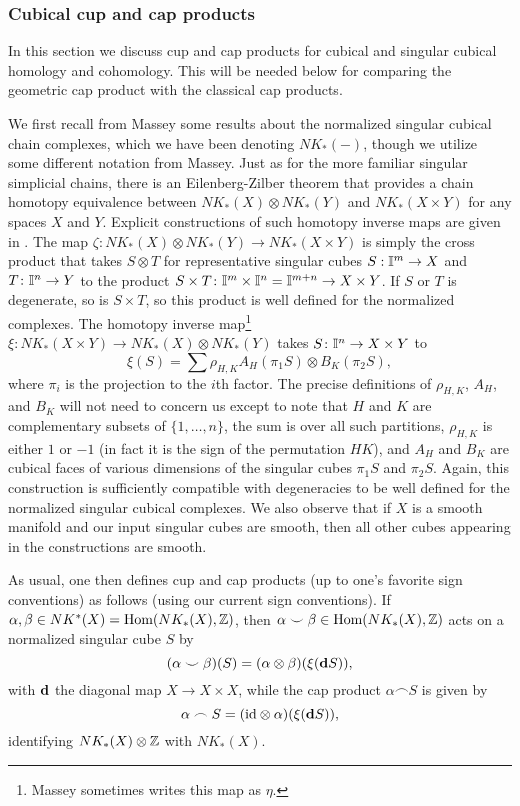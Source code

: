 \subsubsection{Cubical cup and cap products}\label{S: cubical products}

In this section we discuss cup and cap products for cubical and singular cubical homology and cohomology.
This will be needed below for comparing the geometric cap product with the classical cap products.

We first recall from Massey \cite[Chapter XI]{Mas91} some results about the normalized singular cubical chain complexes, which we have been denoting $NK_*(-)$, though we utilize some different notation from Massey.
Just as for the more familiar singular simplicial chains, there is an Eilenberg-Zilber theorem that provides a chain homotopy equivalence between $NK_*(X) \otimes NK_*(Y)$ and $NK_*(X \times Y)$ for any spaces $X$ and $Y$.
Explicit constructions of such homotopy inverse maps are given in \cite[Section XI.5]{Mas91}.
The map $\zeta: NK_*(X) \otimes NK_*(Y) \to NK_*(X \times Y)$ is simply the cross product that takes $S \otimes T$ for representative singular cubes $S: \mathbb{I}^m \to X$ and $T \colon \mathbb{I}^n \to Y$ to the product $S \times T \colon \mathbb{I}^m \times \mathbb{I}^n = \mathbb{I}^{m+n} \to X \times Y$.
If $S$ or $T$ is degenerate, so is $S \times T$, so this product is well defined for the normalized complexes.
The homotopy inverse map\footnote{Massey sometimes writes this map as $\eta$.} $\xi: NK_*(X \times Y) \to NK_*(X) \otimes NK_*(Y)$ takes $S \colon \mathbb{I}^n \to X \times Y$ to
$$\xi(S) = \sum \rho_{H,K}A_H(\pi_1S) \otimes B_K(\pi_2S),$$ where $\pi_i$ is the projection to the $i$th factor.
The precise definitions of $\rho_{H,K}$, $A_H$, and $B_K$ will not need to concern us except to note that $H$ and $K$ are complementary subsets of $\{1,\ldots, n\}$, the sum is over all such partitions, $\rho_{H,K}$ is either $1$ or $-1$ (in fact it is the sign of the permutation $HK$), and $A_H$ and $B_K$ are cubical faces of various dimensions of the singular cubes $\pi_1S$ and $\pi_2S$.
Again, this construction is sufficiently compatible with degeneracies to be well defined for the normalized singular cubical complexes.
We also observe that if $X$ is a smooth manifold and our input singular cubes are smooth, then all other cubes appearing in the constructions are smooth.

As usual, one then defines cup and cap products (up to one's favorite sign conventions) as follows (using our current sign conventions).
If $\alpha, \beta \in NK^*(X) = \textup{Hom}(NK_*(X),\mathbb{Z})$, then $\alpha\smile \beta \in \textup{Hom}(NK_*(X),\mathbb{Z})$ acts on a normalized singular cube $S$ by
\begin{equation}\label{E: cubical cup}
	(\alpha \smile \beta)(S) = (\alpha \otimes \beta)(\xi(\mathbf{d} S)),
\end{equation}
with $\mathbf{d}$ the diagonal map $X \to X \times X$,
while the cap product $\alpha\frown S$ is given by
\begin{equation}\label{E: cubical cap}
	\alpha\frown S = (\mathrm{id} \otimes \alpha) (\xi(\mathbf{d} S)),
\end{equation}
identifying $NK_*(X) \otimes \mathbb{Z}$ with $NK_*(X)$.

